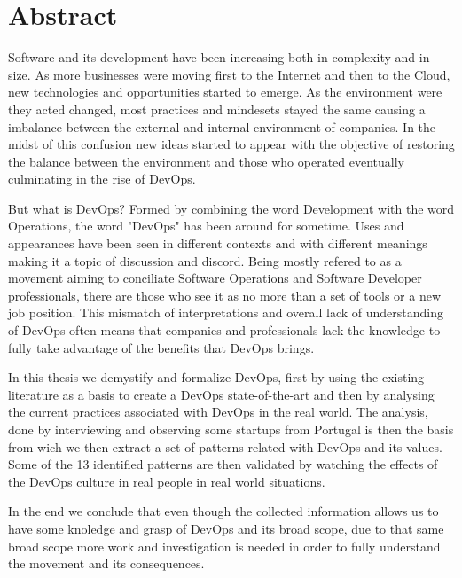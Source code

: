 \chapter*{Abstract}

Software and its development have been increasing both in complexity and in size. As more businesses were moving first to the Internet and then to the Cloud, new technologies and opportunities started to emerge. As the environment were they acted changed, most practices and mindesets stayed the same causing a imbalance between the external and internal environment of companies. In the midst of this confusion new ideas started to appear with the objective of restoring the balance between the environment and those who operated eventually culminating in the rise of DevOps.

But what is DevOps? Formed by combining the word Development with the word Operations, the word  "DevOps" has been around for sometime. Uses and appearances have been seen in different contexts and with different meanings making it a topic of discussion and discord. Being mostly refered to as a movement aiming to conciliate Software Operations and Software Developer professionals, there are those who see it as no more than a set of tools or a new job position. This mismatch of interpretations and overall lack of understanding of DevOps often means that companies and professionals lack the knowledge to fully take advantage of the benefits that DevOps brings. 

In this thesis we demystify and formalize DevOps, first by using the existing literature as a basis to create a DevOps state-of-the-art and then by analysing the current practices associated with DevOps in the real world. The analysis, done by interviewing and observing some startups from Portugal is then the basis from wich we then extract a set of patterns related with DevOps and its values. Some of the 13 identified patterns are then validated by watching the effects of the DevOps culture in real people in real world situations.

In the end we conclude that even though the collected information allows us to have some knoledge and grasp of DevOps and its broad scope, due to that same broad scope more work and investigation is needed in order to fully understand the movement and its consequences.